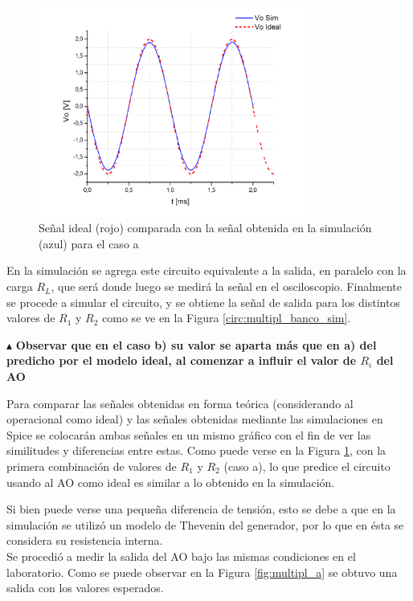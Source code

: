 \begin{figure}[H]
  \centering
      \includegraphics[width=0.8\textwidth]{gfxhernan/fig24.PNG}
  \caption{Señal ideal (rojo) comparada con la señal obtenida en la simulación (azul) para el caso a}
  \label{fig:multipl_simvsideal}
\end{figure}


En la simulación se agrega este circuito equivalente a la salida, en paralelo con la carga $R_{L}$, que será donde luego se medirá la señal en el osciloscopio. Finalmente se procede a simular el circuito, y se obtiene la señal de salida para los distintos valores de $R_{1}$ y $R_{2}$ como se ve en la Figura \ref{circ:multipl_banco_sim}.


\noindent$\blacktriangle$\textbf{ Observar que en el caso b) su valor se aparta más que en a) del predicho por el modelo ideal, al comenzar a influir el valor de $R_{i}$ del AO}

Para comparar las señales obtenidas en forma teórica (considerando al operacional como ideal) y las señales obtenidas mediante las simulaciones en Spice se colocarán ambas señales en un mismo gráfico con el fin de ver las similitudes y diferencias entre estas. Como puede verse en la Figura \ref{fig:multipl_simvsideal}, con la primera combinación de valores de $R_{1}$ y $R_{2}$ (caso a), lo que predice el circuito usando al AO como ideal es similar a lo obtenido en la simulación.


Si bien puede verse una pequeña diferencia de tensión, esto se debe a que en la simulación se utilizó un modelo de Thevenin del generador, por lo que en ésta se considera su resistencia interna.\\

Se procedió a medir la salida del AO bajo las mismas condiciones en el laboratorio. Como se puede observar en la Figura \ref{fig:multipl_a} se obtuvo una salida con los valores esperados.


